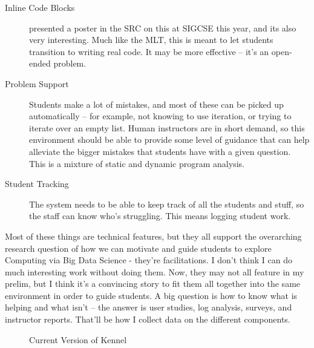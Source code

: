 \documentclass[onecolumn,12pt]{article}
\begin{document}
\begin{description}
	\item[Inline Code Blocks] \cite{Weintrop} presented a poster in the SRC on this at SIGCSE this year, and its also very interesting. Much like the MLT, this is meant to let students transition to writing real code. It may be more effective -- it's an open-ended problem.
	\item[Problem Support] Students make a lot of mistakes, and most of these can be picked up automatically -- for example, not knowing to use iteration, or trying to iterate over an empty list. Human instructors are in short demand, so this environment should be able to provide some level of guidance that can help alleviate the bigger mistakes that students have with a given question. This is a mixture of static and dynamic program analysis.
	\item[Student Tracking] The system needs to be able to keep track of all the students and stuff, so the staff can know who's struggling. This means logging student work.
\end{description}

Most of these things are technical features, but they all support the overarching research question of how we can motivate and guide students to explore Computing via Big Data Science - they're facilitations.
I don't think I can do much interesting work without doing them.
Now, they may not all feature in my prelim, but I think it's a convincing story to fit them all together into the same environment in order to guide students.
A big question is how to know what is helping and what isn't -- the answer is user studies, log analysis, surveys, and instructor reports.
That'll be how I collect data on the different components.

\begin{figure}
\caption{Current Version of Kennel}
\label{fig-kennel}
\end{figure}

    
    
    
        
\end{document}
